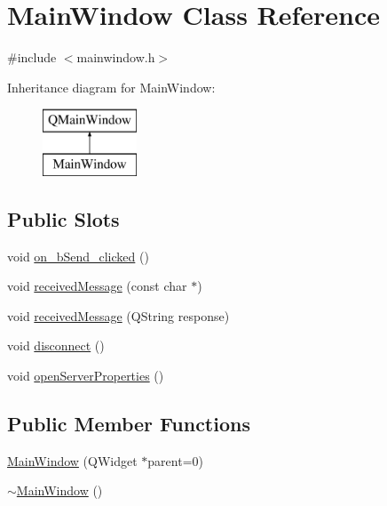 \hypertarget{classMainWindow}{\section{Main\-Window Class Reference}
\label{classMainWindow}
}


{\ttfamily \#include $<$mainwindow.\-h$>$}

Inheritance diagram for Main\-Window\-:\begin{figure}[H]
\begin{center}
\leavevmode
\includegraphics[height=2.000000cm]{classMainWindow}
\end{center}
\end{figure}
\subsection*{Public Slots}
\begin{DoxyCompactItemize}
\item 
void \hyperlink{classMainWindow_a2605ed0a3de91bd4e13316d16887fd60}{on\-\_\-b\-Send\-\_\-clicked} ()
\item 
void \hyperlink{classMainWindow_ab7ed8f9211b6a43151b645f94a019502}{received\-Message} (const char $\ast$)
\item 
void \hyperlink{classMainWindow_a9e94a105f93d43505bd528088fd23846}{received\-Message} (Q\-String response)
\item 
void \hyperlink{classMainWindow_ac2886ac3cabca51c9b4ff8643dfbeff8}{disconnect} ()
\item 
void \hyperlink{classMainWindow_a4358d0320935424d76a693791b1066f5}{open\-Server\-Properties} ()
\end{DoxyCompactItemize}
\subsection*{Public Member Functions}
\begin{DoxyCompactItemize}
\item 
\hyperlink{classMainWindow_a8b244be8b7b7db1b08de2a2acb9409db}{Main\-Window} (Q\-Widget $\ast$parent=0)
\item 
\hyperlink{classMainWindow_ae98d00a93bc118200eeef9f9bba1dba7}{$\sim$\-Main\-Window} ()
\end{DoxyCompactItemize}


